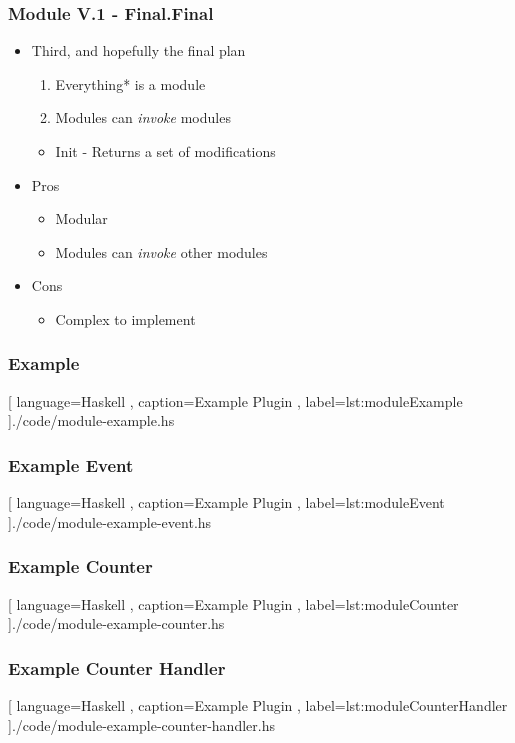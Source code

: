 \showlogo
\begin{frame}
  \frametitle{Module V.1 - Final.Final}
  \begin{itemize}
    \item Third, and hopefully the final plan
      \pause
      \begin{enumerate}
        \item Everything* is a module
          \pause
        \item Modules can \textit{invoke} modules
          \pause
      \end{enumerate}
      \begin{itemize}
        \item Init - Returns a set of modifications
      \end{itemize}
      \pause
    \item Pros
      \pause
      \begin{itemize}
        \item Modular
          \pause
        \item Modules can \textit{invoke} other modules
      \end{itemize}
      \pause
    \item Cons
      \begin{itemize}
          \pause
        \item Complex to implement
      \end{itemize}
  \end{itemize}
\end{frame}

\begin{frame}
  \frametitle{Example}
  \begin{center}
    
    [ language=Haskell
    , caption={Example Plugin}
    , label=lst:moduleExample
    ]{./code/module-example.hs}
  \end{center}
\end{frame}


\begin{frame}
  \frametitle{Example Event}
  \begin{center}
    
    [ language=Haskell
    , caption={Example Plugin}
    , label=lst:moduleEvent
    ]{./code/module-example-event.hs}
  \end{center}
\end{frame}


\begin{frame}
  \frametitle{Example Counter}
  \begin{center}
    
    [ language=Haskell
    , caption={Example Plugin}
    , label=lst:moduleCounter
    ]{./code/module-example-counter.hs}
  \end{center}
\end{frame}


\begin{frame}
  \frametitle{Example Counter Handler}
  \begin{center}
    
    [ language=Haskell
    , caption={Example Plugin}
    , label=lst:moduleCounterHandler
    ]{./code/module-example-counter-handler.hs}
  \end{center}
\end{frame}
